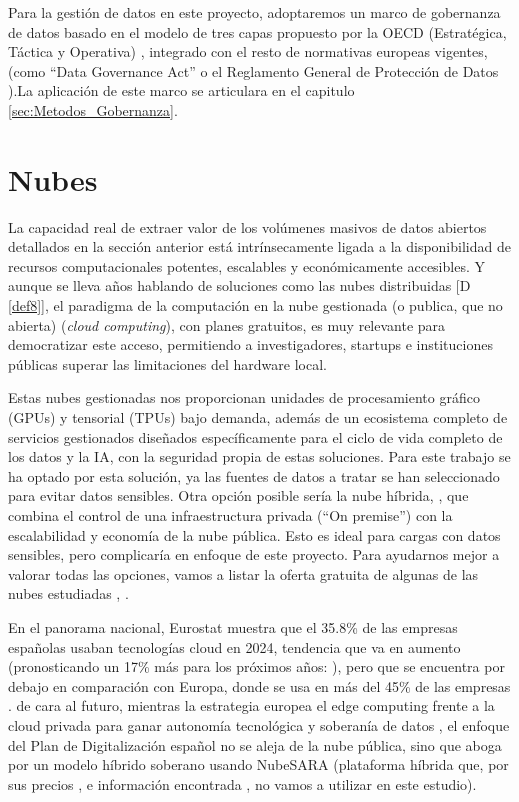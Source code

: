 	Para la gestión de datos en este proyecto, adoptaremos un marco de gobernanza de datos basado en el modelo de tres capas propuesto por la OECD (Estratégica, Táctica y Operativa) \citep{OECD2019}, integrado con  el resto de normativas europeas vigentes, (como ``Data Governance Act'' \citep{EU_DGA_2022} o el Reglamento General de Protección de Datos \citep{webRGPD2016Europa}).La aplicación de este marco se articulara en el capitulo \ref{sec:Metodos_Gobernanza}.
	
\section{Nubes}
\label{sec:EstudiosNubes}

La capacidad real de extraer valor de los volúmenes masivos de datos abiertos detallados en la sección anterior está intrínsecamente ligada a la disponibilidad de recursos computacionales potentes, escalables y económicamente accesibles. Y aunque se lleva años hablando de soluciones como las nubes distribuidas [D \ref{def8}], el paradigma de la computación en la nube gestionada (o publica, que no abierta)  (\textit{cloud computing}), con planes gratuitos, es muy relevante para democratizar este acceso, permitiendo a investigadores, startups e instituciones públicas superar las limitaciones del hardware local.

Estas nubes gestionadas nos proporcionan unidades de procesamiento gráfico (GPUs) y tensorial (TPUs) bajo demanda, además de un ecosistema completo de servicios gestionados diseñados específicamente para el ciclo de vida completo de los datos y la IA, con la seguridad propia de estas soluciones. Para este trabajo se ha optado por esta solución, ya las fuentes de datos a tratar se han seleccionado para evitar datos sensibles. 
Otra opción posible sería la nube híbrida, , que combina el control de una infraestructura privada (``On premise'') con la escalabilidad y economía de la nube pública. Esto es ideal para cargas con datos sensibles, pero complicaría en enfoque de este proyecto. 
Para ayudarnos mejor a valorar todas las opciones, vamos a listar la oferta gratuita de algunas de las nubes estudiadas \citep{MicrosoftCloudTerminology}, \citep{lisdorf2021cloud}.

En el panorama nacional, Eurostat muestra que el 35.8\% de las empresas españolas usaban tecnologías cloud en 2024, tendencia que va en aumento (pronosticando un 17\% más para los próximos años: \cite{EspannaCloudGroeth2033}), pero que se encuentra por debajo en comparación con Europa, donde se usa en más del 45\% de las empresas \citep{EurostatCloudUsage}. de cara al futuro, mientras la estrategia europea el edge computing frente a la cloud privada para ganar autonomía tecnológica y soberanía de datos \citep{EuroDigitalStrategyEdge}, el enfoque del Plan de Digitalización español \citep{GobEspana2021PlanDigitalizacion} no se aleja de la nube pública, sino que aboga por un modelo híbrido soberano usando NubeSARA (plataforma híbrida que, por sus precios \citep{EurostatCloudUsage}, e información encontrada \citep{InfoNubeSARA}, \citep{InfoPreparaTICNubeSARA} no vamos a utilizar en este estudio).

